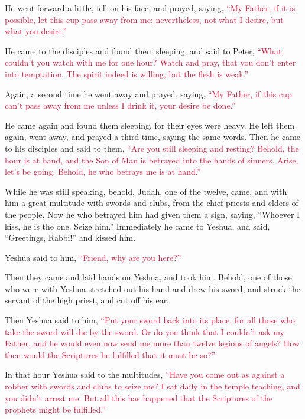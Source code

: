 \myverse{}He went forward a little, fell on his face, and prayed, saying,
\textcolor{crimson}{“My Father, if it is possible, let this cup pass away from me; nevertheless, not what I desire, but
	what you desire.”}

\myverse{}He came to the disciples and found them sleeping, and said to
Peter,
\textcolor{crimson}{“What, couldn’t you watch with me for one hour?
}
\myverse{}\textcolor{crimson}{Watch and pray, that you don’t enter into temptation. The spirit indeed
	is willing, but the flesh is weak.”}

\myverse{}Again, a second time he went away and prayed, saying,
\textcolor{crimson}{“My Father, if this cup can’t pass away from me unless I drink it, your desire be done.”
}

\myverse{}He came again and found them sleeping, for their eyes were heavy.
\myverse{}He left them again, went away, and prayed a third time, saying the same words.
\myverse{}Then he came to his disciples and said to them,
\textcolor{crimson}{“Are you still sleeping and resting? Behold, the hour is at hand, and the Son of Man is betrayed into
	the hands of sinners.
}
\myverse{}\textcolor{crimson}{Arise, let’s be going. Behold, he who betrays me is at hand.”
}

\myverse{}While he was still speaking, behold, Judah, one of the twelve,
came, and with him a great multitude with swords and clubs, from the chief priests and elders of the people.
\myverse{}Now he who betrayed him had given them a sign, saying, “Whoever I kiss, he
is the one. Seize him.”
\myverse{}Immediately he came to Yeshua, and said, “Greetings, Rabbi!” and kissed him.

\myverse{}Yeshua said to him,
\textcolor{crimson}{“Friend, why are you here?”}

Then they came and laid hands on Yeshua, and took him.
\myverse{}Behold, one of those who were with Yeshua stretched out his hand and drew
his sword, and struck the servant of the high priest, and cut off his ear.

\myverse{}Then Yeshua said to him,
\textcolor{crimson}{“Put your sword back into its place, for all those who take the sword will die by the sword.
}
\myverse{}\textcolor{crimson}{Or do you think that I couldn’t ask my Father, and he would even now
	send me more than twelve legions of angels?
}
\myverse{}\textcolor{crimson}{How then would the Scriptures be fulfilled that it must be so?”
}

\myverse{}In that hour Yeshua said to the multitudes,
\textcolor{crimson}{“Have you come out as against a robber with swords and clubs to seize me? I sat daily in the temple
	teaching, and you didn’t arrest me.
}
\myverse{}\textcolor{crimson}{But all this has happened that the Scriptures of the prophets might be
	fulfilled.”}

